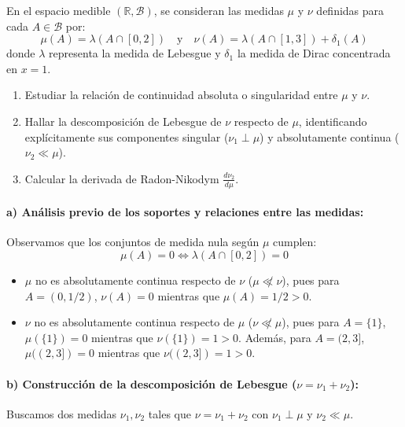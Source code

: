 \newpage %

\begin{problema}
En el espacio medible $(\mathbb{R}, \mathcal{B})$, se consideran las medidas $\mu$ y $\nu$ definidas para cada $A \in \mathcal{B}$ por:
\[
    \mu(A) = \lambda(A \cap [0, 2]) \quad \text{y} \quad \nu(A) = \lambda(A \cap [1, 3]) + \delta_1(A)
\]
donde $\lambda$ representa la medida de Lebesgue y $\delta_1$ la medida de Dirac concentrada en $x = 1$.
\begin{enumerate}[label=\alph*)]
    \item Estudiar la relación de continuidad absoluta o singularidad entre $\mu$ y $\nu$.
    \item Hallar la descomposición de Lebesgue de $\nu$ respecto de $\mu$, identificando explícitamente sus componentes singular ($\nu_1 \perp \mu$) y absolutamente continua ($\nu_2 \ll \mu$).
    \item Calcular la derivada de Radon-Nikodym $\frac{d\nu_2}{d\mu}$.
\end{enumerate}

\tcblower

\paragraph{a) Análisis previo de los soportes y relaciones entre las medidas:}
Observamos que los conjuntos de medida nula según $\mu$ cumplen:
\[
    \mu(A) = 0 \iff \lambda(A \cap [0, 2]) = 0
\]
\begin{itemize}
    \item $\mu$ no es absolutamente continua respecto de $\nu$ ($\mu \not\ll \nu$), pues para $A = (0, 1/2)$, $\nu(A) = 0$ mientras que $\mu(A) = 1/2 > 0$.
    \item $\nu$ no es absolutamente continua respecto de $\mu$ ($\nu \not\ll \mu$), pues para $A = \{1\}$, $\mu(\{1\}) = 0$ mientras que $\nu(\{1\}) = 1 > 0$. Además, para $A = (2, 3]$, $\mu((2,3]) = 0$ mientras que $\nu((2,3]) = 1 > 0$.
\end{itemize}

\paragraph{b) Construcción de la descomposición de Lebesgue ($\nu = \nu_1 + \nu_2$):}
Buscamos dos medidas $\nu_1, \nu_2$ tales que $\nu = \nu_1 + \nu_2$ con $\nu_1 \perp \mu$ y $\nu_2 \ll \mu$.


\end{problema}
